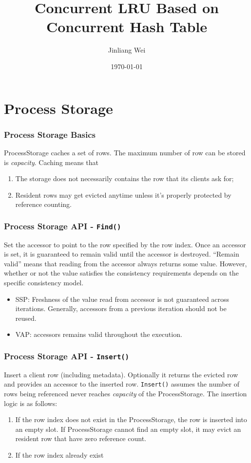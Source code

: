 \documentclass{beamer}
\begin{document}
\title{Concurrent LRU Based on Concurrent Hash Table} 
\author{Jinliang Wei} 
\date{\today} 

\frame{\titlepage} 


\section{Process Storage}

\begin{frame}
\frametitle{Process Storage Basics}
ProcessStorage caches a set of rows. The maximum number of row can be stored is
\emph{capacity}. Caching means that 
\begin{enumerate}
\item The storage does not necessarily contains the row that its clients ask for;
\item Resident rows may get evicted anytime unless it's properly protected by 
reference counting. 
\end{enumerate}

\end{frame}

\begin{frame}
\frametitle{Process Storage API - \texttt{Find()}}
Set the accessor to point to the row specified by 
  the row index. Once an accessor is set, it is guaranteed to remain valid until
 the accessor is destroyed. ``Remain valid'' means that reading
from the accessor always returns some value. However, whether or not the value 
satisfies the consistency requirements depends on the specific consistency model.
\begin{itemize}
\item SSP: Freshness of the value read from accessor is not guaranteed across iterations.
  Generally, accessors from a previous iteration should not be reused.
\item VAP: accessors remains valid throughout the execution.
\end{itemize}
\end{frame}

\begin{frame}
\frametitle{Process Storage API - \texttt{Insert()}}
Insert a client row (including metadata). Optionally it returns the evicted row and
provides an accessor to the inserted row. \texttt{Insert()} assumes the number of rows
being referenced never reaches \emph{capacity} of the ProcessStorage.
The insertion logic is as follows:
\begin{enumerate}
\item If the row index does not exist in the ProcessStorage, the row is inserted
 into an empty slot. If ProcessStorage cannot find an empty slot, it may evict an
 resident row that have zero reference count.
\item If the row index already exist
\end{enumerate}

\end{frame}
\end{document}
